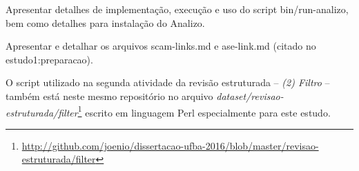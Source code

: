 

Apresentar detalhes de implementação, execução e uso do script bin/run-analizo, bem como detalhes para instalação do Analizo.







Apresentar e detalhar os arquivos scam-links.md e ase-link.md (citado no estudo1:preparacao).


O script utilizado na segunda atividade da revisão estruturada -- {\it (2)
Filtro} -- também está neste mesmo repositório no arquivo {\it
dataset/revisao-estruturada/filter}\footnote{\url{http://github.com/joenio/dissertacao-ufba-2016/blob/master/revisao-estruturada/filter}}
escrito em linguagem Perl especialmente para este estudo.


